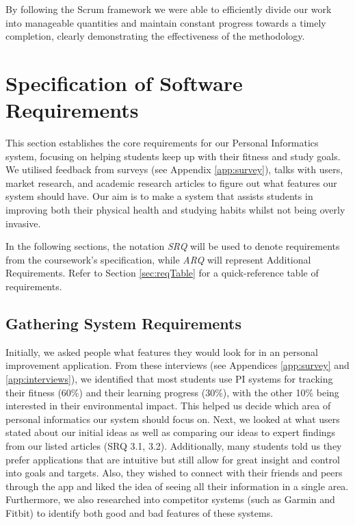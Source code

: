 \documentclass[11pt]{article}
\begin{document}
By following the Scrum framework we were able to efficiently divide our work 
into manageable quantities and maintain constant progress towards a timely 
completion, clearly demonstrating the effectiveness of the methodology.\par

\section{Specification of Software Requirements}

This section establishes the core requirements for our Personal Informatics system, 
focusing on helping students keep up with their fitness and study
goals. We utilised feedback from surveys (see Appendix \ref{app:survey}), talks
with users, market research, and academic research articles to figure out what
features our system should have. Our aim is to make a system that assists
students in improving both their physical health and studying habits whilst not
being overly invasive.\par

In the following sections, the notation \textit{SRQ} will be used to denote
requirements from the coursework's specification, while \textit{ARQ} will
represent Additional Requirements. Refer to Section \ref{sec:reqTable} for a
quick-reference table of requirements.

\newpage

\subsection{Gathering System Requirements}

Initially, we asked people what features they would look for in an personal
improvement application. From these interviews (see Appendices \ref{app:survey}
and \ref{app:interviews}), we identified that most students use PI systems for
tracking their fitness (60\%) and their learning progress (30\%), with the
other 10\% being interested in their environmental impact. This helped us
decide which area of personal informatics our system should focus on. Next, we
looked at what users stated about our initial ideas as well as comparing our
ideas to expert findings from our listed articles (SRQ 3.1, 3.2). Additionally,
many students told us they prefer applications that are intuitive but still
allow for great insight and control into goals and targets. Also, they wished
to connect with their friends and peers through the app and liked the idea of
seeing all their information in a single area. Furthermore, we also researched
into competitor systems (such as Garmin and Fitbit) to identify both good and
bad features of these systems.\par
\end{document}
